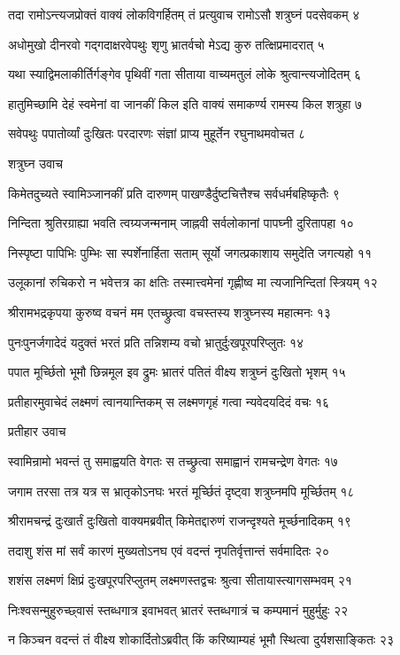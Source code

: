 तदा रामोऽन्त्यजप्रोक्तं वाक्यं लोकविगर्हितम्
तं प्रत्युवाच रामोऽसौ शत्रुघ्नं पदसेवकम् ४

अधोमुखो दीनरवो गद्गदाक्षरवेपथुः
शृणु भ्रातर्वचो मेऽद्य कुरु तत्क्षिप्रमादरात् ५

यथा स्याद्विमलाकीर्तिर्गङ्गेव पृथिवीं गता
सीताया वाच्यमतुलं लोके श्रुत्वान्त्यजोदितम् ६

हातुमिच्छामि देहं स्वमेनां वा जानकीं किल
इति वाक्यं समाकर्ण्य रामस्य किल शत्रुहा ७

सवेपथुः पपातोर्व्यां दुःखितः परदारणः
संज्ञां प्राप्य मुहूर्तेन रघुनाथमवोचत ८

शत्रुघ्न उवाच

किमेतदुच्यते स्वामिञ्जानकीं प्रति दारुणम्
पाखण्डैर्दुष्टचित्तैश्च सर्वधर्मबहिष्कृतैः ९

निन्दिता श्रुतिरग्राह्या भवति त्वग्र्यजन्मनाम्
जाह्नवी सर्वलोकानां पापघ्नी दुरितापहा १०

निस्पृष्टा पापिभिः पुम्भिः सा स्पर्शेनार्हिता सताम्
सूर्यो जगत्प्रकाशाय समुदेति जगत्यहो ११

उलूकानां रुचिकरो न भवेत्तत्र का क्षतिः
तस्मात्त्वमेनां गृह्णीष्व मा त्यजानिन्दितां स्त्रियम् १२

श्रीरामभद्रकृपया कुरुष्व वचनं मम
एतच्छ्रुत्वा वचस्तस्य शत्रुघ्नस्य महात्मनः १३

पुनःपुनर्जगादेदं यदुक्तं भरतं प्रति
तन्निशम्य वचो भ्रातुर्दुःखपूरपरिप्लुतः १४

पपात मूर्च्छितो भूमौ छिन्नमूल इव द्रुमः
भ्रातरं पतितं वीक्ष्य शत्रुघ्नं दुःखितो भृशम् १५

प्रतीहारमुवाचेदं लक्ष्मणं त्वानयान्तिकम्
स लक्ष्मणगृहं गत्वा न्यवेदयदिदं वचः १६

प्रतीहार उवाच

स्वामिन्रामो भवन्तं तु समाह्वयति वेगतः
स तच्छ्रुत्वा समाह्वानं रामचन्द्रेण वेगतः १७

जगाम तरसा तत्र यत्र स भ्रातृकोऽनघः
भरतं मूर्च्छितं दृष्ट्वा शत्रुघ्नमपि मूर्च्छितम् १८

श्रीरामचन्द्रं दुःखार्तं दुःखितो वाक्यमब्रवीत्
किमेतद्दारुणं राजन्दृश्यते मूर्च्छनादिकम् १९

तदाशु शंस मां सर्वं कारणं मुख्यतोऽनघ
एवं वदन्तं नृपतिर्वृत्तान्तं सर्वमादितः २०

शशंस लक्ष्मणं क्षिप्रं दुःखपूरपरिप्लुतम्
लक्ष्मणस्तद्वचः श्रुत्वा सीतायास्त्यागसम्भवम् २१

निःश्वसन्मुहुरुच्छ्वासं स्तब्धगात्र इवाभवत्
भ्रातरं स्तब्धगात्रं च कम्पमानं मुहुर्मुहुः २२

न किञ्चन वदन्तं तं वीक्ष्य शोकार्दितोऽब्रवीत्
किं करिष्याम्यहं भूमौ स्थित्वा दुर्यशसाङ्कितः २३

